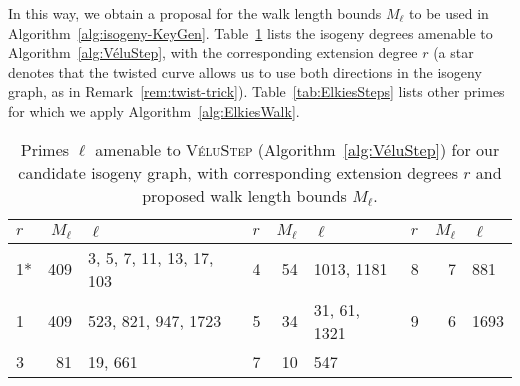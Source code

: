 \documentclass{llncs}
\newcommand{\algstyle}[1]{\textsc{#1}}
\begin{document}
In this way, we obtain a proposal for the walk length bounds $M_\ell$
to be used in Algorithm~\ref{alg:isogeny-KeyGen}. Table~\ref{tab:VéluSteps}
lists the isogeny degrees amenable to Algorithm~\ref{alg:VéluStep}, with
the corresponding extension degree $r$ 
(a star denotes that the twisted curve
allows us to use both directions in the isogeny graph,
as in Remark~\ref{rem:twist-trick}).
Table~\ref{tab:ElkiesSteps}
lists other primes for which we apply Algorithm~\ref{alg:ElkiesWalk}.

\begin{table}
    \centering
    \begin{tabular}{l|@{\;}r@{\;}|@{\;}l@{\;}||l|@{\;}r@{\;}|@{\;}l@{\;}||@{\;}l|r@{\;}|@{\;}l}
        $r$ & $M_\ell$ & $\ell$
        &
        $r$ & $M_\ell$ & $\ell$
        &
        $r$ & $M_\ell$ & $\ell$
        \\
        \hline
        1* & 409 & 3, 5, 7, 11, 13, 17, 103
        &
        4 & 54 & 1013, 1181
        &
        8 & 7 & 881
        \\
        1 & 409 & 523, 821, 947, 1723
        &
        5 & 34 & 31, 61, 1321
        &
        9 & 6 & 1693
        \\
        3 & 81 & 19, 661
        &
        7 & 10 & 547
        & & 
        \\
        \hline
    \end{tabular}
    \smallskip
    \caption{Primes $\ell$ amenable to \algstyle{VéluStep}
    (Algorithm~\ref{alg:VéluStep}) for our candidate isogeny graph,
    with corresponding extension degrees $r$ 
    and proposed walk length bounds $M_\ell$.}
    \label{tab:VéluSteps}
\end{table}

%
\end{document}
